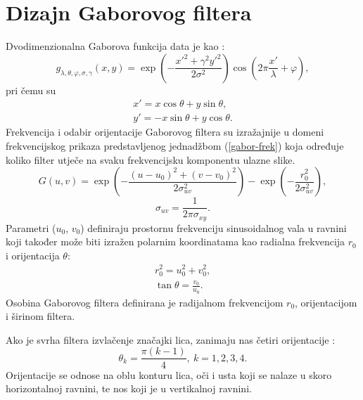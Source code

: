 \documentclass{article}
\begin{document}
\section{Dizajn Gaborovog filtera}
Dvodimenzionalna Gaborova funkcija data je kao \citep{petkovgabor}:
\begin{equation}
g_{\lambda,\theta,\varphi,\sigma,\gamma}(x,y) = \exp\left ( -
\frac{x'^2+\gamma^2 y'^2}{2\sigma^2}\right ) \cos \left ( 2\pi \frac{x'}{\lambda} + \varphi \right ),
\label{2d-gabor}
\end{equation}
pri čemu su
\begin{eqnarray*}
x' = x \cos \theta + y \sin \theta, \\
y' = -x \sin \theta + y \cos \theta.
\end{eqnarray*}
Frekvencija i odabir orijentacije Gaborovog filtera su izražajnije u domeni
frekvencijskog prikaza predstavljenog jednadžbom (\ref{gabor-frek}) koja
određuje koliko filter utječe na svaku frekvencijsku komponentu ulazne slike.
\begin{equation}
G(u,v) = \exp \left ( - \frac{(u-u_0)^2 + (v-v_0)^2}{2\sigma^2_{uv}}\right ) -
\exp \left ( - \frac{r_0^2}{2\sigma^2_{uv}} \right),
\label{gabor-frek}
\end{equation}
\begin{equation}
\sigma_{uv} = \frac{1}{2\pi \sigma_{xy}}.
\end{equation}
Parametri ($u_0$, $v_0$) definiraju prostornu frekvenciju sinusoidalnog vala u
ravnini koji također može biti izražen polarnim koordinatama kao radialna frekvencija $r_0$ i
orijentacija $\theta$:
\begin{eqnarray}
r_0^2 = u_0^2 + v_0^2, \\
\tan \theta = \frac{v_0}{u_0}.
\end{eqnarray}
Osobina Gaborovog filtera definirana je radijalnom frekvencijom $r_0$,
orijentacijom i širinom filtera.

Ako je svrha filtera izvlačenje značajki lica, zanimaju nas četiri orijentacije
\citep{huang2005robust}:
\begin{equation}
\theta_k = \frac{\pi(k-1)}{4},\: k = 1,2,3,4.
\label{equ:orijentacije}
\end{equation}
Orijentacije se odnose na oblu konturu lica, oči i usta koji se nalaze u skoro
horizontalnoj ravnini, te nos koji je u vertikalnoj ravnini.
\end{document}
